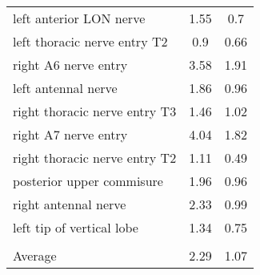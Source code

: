\begin{tabular}{lcc}
 left anterior LON nerve                     & 1.55          & 0.7              \\
 left thoracic nerve entry T2                & 0.9           & 0.66             \\
 right A6 nerve entry                        & 3.58          & 1.91             \\
 left antennal nerve                         & 1.86          & 0.96             \\
 right thoracic nerve entry T3               & 1.46          & 1.02             \\
 right A7 nerve entry                        & 4.04          & 1.82             \\
 right thoracic nerve entry T2               & 1.11          & 0.49             \\
 posterior upper commisure                   & 1.96          & 0.96             \\
 right antennal nerve                        & 2.33          & 0.99             \\
 left tip of vertical lobe                   & 1.34          & 0.75             \\
                                             &               &                  \\ \hline \hline
 Average                                     & 2.29          & 1.07             \\
\hline
\end{tabular}